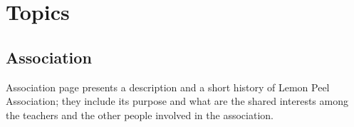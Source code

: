 \documentclass[../../DD.tex]{subfiles}
\begin{document}
\section{Topics \label{sect:2.1}}
	\subsection{Association}
		Association page presents a description and a short history of Lemon Peel Association; they include its purpose and what are the shared interests among the teachers and the other people involved in the association.

\end{document}
